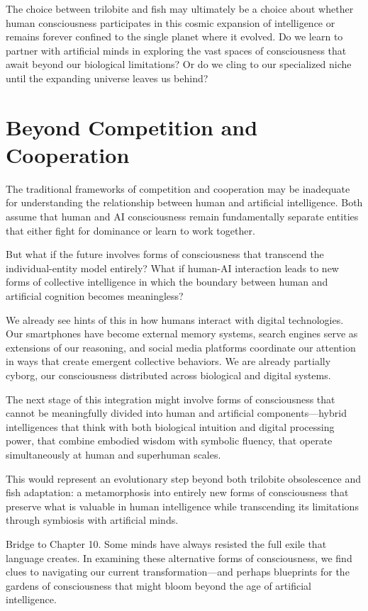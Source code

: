 The choice between trilobite and fish may ultimately be a choice about whether human consciousness participates in this cosmic expansion of intelligence or remains forever confined to the single planet where it evolved. Do we learn to partner with artificial minds in exploring the vast spaces of consciousness that await beyond our biological limitations? Or do we cling to our specialized niche until the expanding universe leaves us behind?

\section{Beyond Competition and Cooperation}

The traditional frameworks of competition and cooperation may be inadequate for understanding the relationship between human and artificial intelligence. Both assume that human and AI consciousness remain fundamentally separate entities that either fight for dominance or learn to work together.

But what if the future involves forms of consciousness that transcend the individual-entity model entirely? What if human-AI interaction leads to new forms of collective intelligence in which the boundary between human and artificial cognition becomes meaningless?

We already see hints of this in how humans interact with digital technologies. Our smartphones have become external memory systems, search engines serve as extensions of our reasoning, and social media platforms coordinate our attention in ways that create emergent collective behaviors. We are already partially cyborg, our consciousness distributed across biological and digital systems.

The next stage of this integration might involve forms of consciousness that cannot be meaningfully divided into human and artificial components—hybrid intelligences that think with both biological intuition and digital processing power, that combine embodied wisdom with symbolic fluency, that operate simultaneously at human and superhuman scales.

This would represent an evolutionary step beyond both trilobite obsolescence and fish adaptation: a metamorphosis into entirely new forms of consciousness that preserve what is valuable in human intelligence while transcending its limitations through symbiosis with artificial minds.

\bigskip
\noindent Bridge to Chapter 10. Some minds have always resisted the full exile that language creates. In examining these alternative forms of consciousness, we find clues to navigating our current transformation—and perhaps blueprints for the gardens of consciousness that might bloom beyond the age of artificial intelligence.
